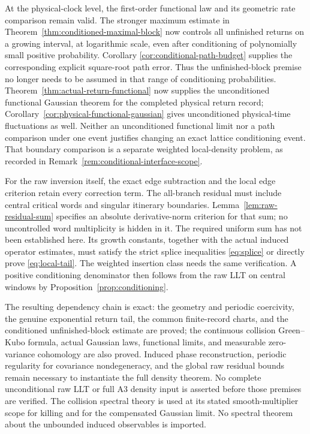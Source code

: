 At the physical-clock level, the first-order functional law and its
geometric rate comparison remain valid. The stronger maximum estimate
in Theorem~\ref{thm:conditioned-maximal-block} now controls all unfinished
returns on a growing interval, at logarithmic scale, even after
conditioning of polynomially small positive probability. Corollary
\ref{cor:conditional-path-budget} supplies the corresponding explicit
square-root path error. Thus the unfinished-block premise no longer
needs to be assumed in that range of conditioning probabilities.
Theorem~\ref{thm:actual-return-functional} now supplies the unconditioned
functional Gaussian theorem for the completed physical return record;
Corollary~\ref{cor:physical-functional-gaussian} gives unconditioned
physical-time fluctuations as well. Neither an unconditioned functional
limit nor a path comparison under one event justifies changing an exact
lattice conditioning event. That boundary comparison is a separate
weighted local-density problem, as recorded in
Remark~\ref{rem:conditional-interface-scope}.

For the raw inversion itself, the exact edge subtraction and the local
edge criterion retain every correction term. The all-branch residual
must include central critical words and singular itinerary boundaries.
Lemma~\ref{lem:raw-residual-sum} specifies an absolute derivative-norm
criterion for that sum; no uncontrolled word multiplicity is hidden in
it. The required uniform sum has not been established here. Its growth
constants, together with the actual induced operator estimates, must
satisfy the strict splice inequalities \eqref{eq:splice} or directly
prove \eqref{eq:local-tail}. The weighted insertion class needs the same
verification. A positive conditioning denominator then follows from the
raw LLT on central windows by Proposition~\ref{prop:conditioning}.

The resulting dependency chain is exact: the geometry and periodic
coercivity, the genuine exponential return tail, the common finite-record
charts, and the conditioned unfinished-block estimate are proved;
the continuous collision Green--Kubo formula, actual Gaussian laws,
functional limits, and measurable zero-variance cohomology are also
proved. Induced phase reconstruction, periodic regularity for covariance
nondegeneracy, and the global raw residual bounds remain necessary to
instantiate the full density theorem. No complete unconditional raw
LLT or full A3 density input is asserted before those premises are
verified. The collision spectral theory is used at its stated smooth-multiplier
scope for killing and for the compensated Gaussian limit. No spectral
theorem about the unbounded induced observables is imported.

